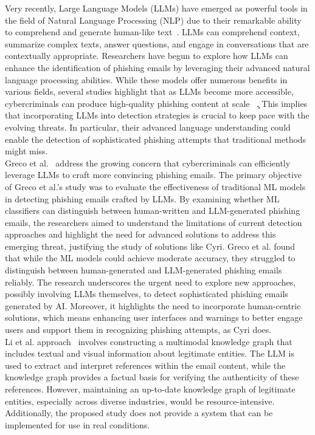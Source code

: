 Very recently, Large Language Models (LLMs) have emerged as powerful tools in the field of Natural Language Processing (NLP)  due to their remarkable ability to comprehend and generate human-like text~\cite{b38}. LLMs can comprehend context, summarize complex texts, answer questions, and engage in conversations that are contextually appropriate. Researchers have begun to explore how LLMs can enhance the identification of phishing emails by leveraging their advanced natural language processing abilities.
While these models offer numerous benefits in various fields, several studies highlight that as LLMs become more accessible, cybercriminals can produce high-quality phishing content at scale~\cite{b24, b25, b26, b35} \c. This implies that incorporating LLMs into detection strategies is crucial to keep pace with the evolving threats. In particular, their advanced language understanding could enable the detection of sophisticated phishing attempts that traditional methods might miss.\\
Greco et al.~\cite{b24} address the growing concern that cybercriminals can efficiently leverage LLMs to craft more convincing phishing emails. The primary objective of Greco et al.’s study was to evaluate the effectiveness of traditional ML models in detecting phishing emails crafted by LLMs. By examining whether ML classifiers can distinguish between human-written and LLM-generated phishing emails, the researchers aimed to understand the limitations of current detection approaches and highlight the need for advanced solutions to address this emerging threat, justifying the study of solutions like Cyri. Greco et al. found that while the ML models could achieve moderate accuracy, they struggled to distinguish between human-generated and LLM-generated phishing emails reliably. The research underscores the urgent need to explore new approaches, possibly involving LLMs themselves, to detect sophisticated phishing emails generated by AI.
Moreover, it highlights the need to incorporate human-centric solutions, which means enhancing user interfaces and warnings to better engage users and support them in recognizing phishing attempts, as Cyri does. \\ 
Li et al. approach~\cite{b28} involves constructing a multimodal knowledge graph that includes textual and visual information about legitimate entities. The LLM is used
to extract and interpret references within the email content, while the knowledge graph provides a factual basis for verifying the authenticity of these references. However, maintaining an up-to-date knowledge graph of legitimate entities, especially across diverse industries, would be resource-intensive. Additionally, the proposed study does not provide a system that can be implemented for use in real conditions.

